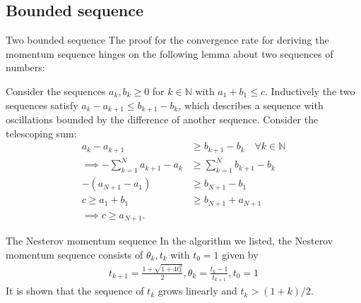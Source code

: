 \documentclass[11pt]{beamer}
\begin{document}
    \subsection{Bounded sequence}
        \begin{frame}{Two bounded sequence}
            The proof for the convergence rate for deriving the momentum sequence hinges on the following lemma about two sequences of numbers:
            \begin{lemma}
                Consider the sequences $a_k, b_k \ge 0$ for $k\in \mathbb N$ with $a_1 + b_1 \le c$. Inductively the two sequences satisfy $a_{k} - a_{k + 1} \le b_{k + 1} - b_k$, which describes a sequence with oscillations bounded by the difference of another sequence. Consider the telescoping sum: 
                \begin{align*}
                    a_{k} - a_{k + 1} 
                    &\ge b_{k + 1} - b_k \quad \forall k \in \mathbb N
                    \\
                    \implies
                    -\sum_{k = 1}^{N}
                    a_{k + 1} - a_k 
                    &\ge 
                    \sum_{k = 1}^{N} b_{k + 1} - b_k
                    \\
                    - (a_{N + 1} - a_1) 
                    &\ge b_{N + 1} - b_1
                    \\
                    c\ge a_1 + b_1
                    &\ge
                    b_{N + 1} + a_{N +1}
                    \\
                    \implies c \ge a_{N+1}. 
                \end{align*}
            \end{lemma}
        \end{frame}    
    \begin{frame}{The Nesterov momentum sequence}
        In the algorithm we listed, the Nesterov momentum sequence consists of $\theta_k, t_k$ with $t_0 = 1$ given by
        \begin{align}
            t_{k+1} = \frac{1 + \sqrt{1 + 4t_k^2}}{2}, \theta_k = \frac{t_k - 1}{t_{k + 1}}, t_0 = 1
        \end{align}
        It is shown that the sequence of $t_k$ grows linearly and $t_k > (1 + k)/2$. 
    \end{frame}
\end{document}
